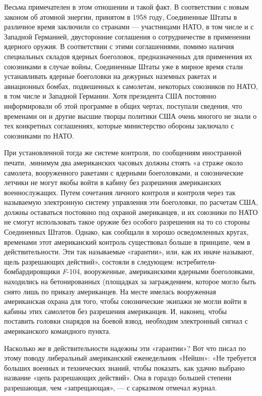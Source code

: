 \documentclass[12pt, a4paper, openany]{book}
\begin{document}
	Весьма примечателен в этом отношении и такой факт. В соответствии с новым законом об атомной энергии, принятом в 1958 году, Соединенные Штаты в различное время заключили со странами — участницами НАТО, в том числе и с Западной Германией, двусторонние соглашения о сотрудничестве в применении ядерного оружия. В соответствии с этими соглашениями, помимо наличия специальных складов ядерных боеголовок, предназначенных для применения их союзниками в случае войны, Соединенные Штаты уже в мирное время стали устанавливать ядерные боеголовки на дежурных наземных ракетах и авиационных бомбах, подвешенных к самолетам, некоторых союзников по НАТО, в том числе и Западной Германии. Хотя президента США постоянно информировали об этой программе в общих чертах, поступали сведения, что временами он и другие высшие творцы политики США очень многого не знали о тех конкретных соглашениях, которые министерство обороны заключало с союзниками по НАТО. 
	
	При установленной тогда же системе контроля, по сообщениям иностранной печати, .минимум два американских часовых должны стоять «а страже около самолета, вооруженного ракетами с ядерными боеголовками, и союзнические летчики не могут якобы войти в кабину без разрешения американских военнослужащих. Путем сочетания личного контроля и контроля через так называемую электронную систему управления эти боеголовки, по расчетам США, должны оставаться постоянно под охраной американцев, и их союзники по НАТО не смогут использовать такое оружие без особого разрешения на то со стороны Соединенных Штатов. Однако, как сообщали в хорошо осведомленных кругах, временами этот американский контроль существовал больше в принципе, чем в действительности. Эти так называемые «гарантии», или, как их иначе называют, щель разрешающих действий», состояли в следующем: истребители-бомбардировщики \textit{F}-104, вооруженные, американскими ядерными боеголовками, находились на бетонированных (площадках за заграждением, которое могло быть снято лишь по приказу американцев. На месте имелась вооруженная американская охрана для того, чтобы союзнические экипажи не могли войти в кабины этих самолетов без разрешения американцев. И, наконец, чтобы поставить головки снарядов на боевой взвод, необходим электронный сигнал с американского командного пункта.
	
	Насколько же в действительности надежны эти «гарантии»? Вот что писал по этому поводу либеральный американский еженедельник «Нейшн»: «Не требуется больших военных и технических знаний, чтобы показать, как удачно выбрано название «цепь разрешающих действий». Она в гораздо большей степени разрешающая, чем «запрещающая», — с сарказмом отмечал журнал.
	
\end{document}

